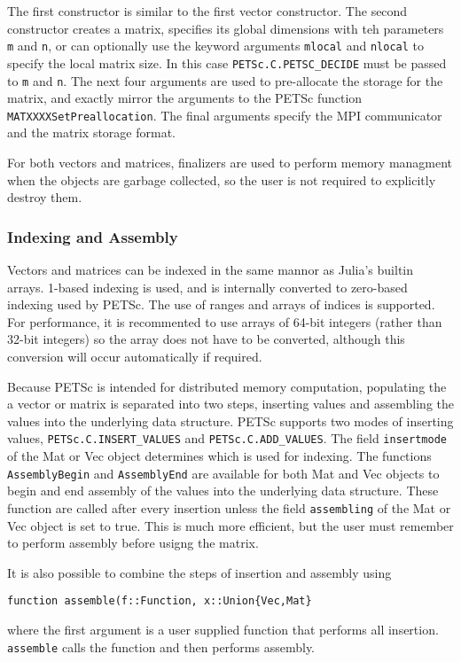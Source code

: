 \documentclass{article}
\newcommand{\ttt}{\texttt}
\begin{document}
The first constructor is similar to the first vector constructor.
The second constructor creates a matrix, specifies its global dimensions with teh parameters \ttt{m} and \ttt{n}, or can optionally use the keyword arguments \ttt{mlocal} and \ttt{nlocal} to specify the local matrix size.
In this case \ttt{PETSc.C.PETSC\_DECIDE} must be passed to \ttt{m} and \ttt{n}.
The next four arguments are used to pre-allocate the storage for the matrix, and exactly mirror the arguments to the PETSc function \ttt{MATXXXXSetPreallocation}.
The final arguments specify the MPI communicator and the matrix storage format.

For both vectors and matrices, finalizers are used to perform memory managment when the objects are garbage collected, so the user is not required to explicitly destroy them.

\subsubsection{Indexing and Assembly}
Vectors and matrices can be indexed in the same mannor as Julia's builtin arrays.
1-based indexing is used, and is internally converted to zero-based indexing used by PETSc.
The use of ranges and arrays of indices is supported.
For performance, it is recommented to use arrays of 64-bit integers (rather than 32-bit integers) so the array does not have to be converted, although this conversion will occur automatically if required.

Because PETSc is intended for distributed memory computation, populating the a vector or matrix is separated into two steps, inserting values and assembling the values into the underlying data structure.
PETSc supports two modes of inserting values, \ttt{PETSc.C.INSERT\_VALUES} and \ttt{PETSc.C.ADD\_VALUES}.
The field \ttt{insertmode} of the Mat or Vec object  determines which is used for indexing.
The functions \ttt{AssemblyBegin} and \ttt{AssemblyEnd} are available for both Mat and Vec objects to begin and end assembly of the values into the underlying data structure.
These function are called after every insertion unless the field \ttt{assembling} of the Mat or Vec object is set to true.
This is much more efficient, but the user must remember to perform assembly before usigng the matrix.

It is also possible to combine the steps of insertion and assembly using
\begin{verbatim}
function assemble(f::Function, x::Union{Vec,Mat}
\end{verbatim}
where the first argument is a user supplied function that performs all insertion.
\ttt{assemble} calls the function and then performs assembly.
\end{document}
